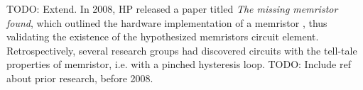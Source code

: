 TODO: Extend. In 2008, HP released a paper titled \textit{The missing memristor found}, which outlined the hardware implementation of a memristor \cite{hp_memristor_found}, thus validating the existence of the hypothesized memristors circuit element. Retrospectively, several research groups had discovered circuits with the tell-tale properties of memristor, i.e. with a pinched hysteresis loop. TODO: Include ref about prior research, before 2008.

%
%
%
%
%
%
%
%

%

%

%

%


